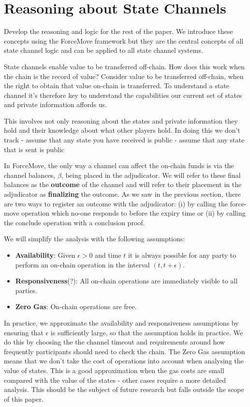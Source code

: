 \documentclass{article}
\theoremstyle{definition}
\begin{document}
\section{Reasoning about State Channels}

Develop the reasoning and logic for the rest of the paper.
We introduce these concepts using the ForceMove framework but they are the central concepts of all state channel logic and can be applied to all state channel systems.

State channels enable value to be transferred off-chain.
How does this work when the chain is the record of value?
Consider value to be transferred off-chain, when the right to obtain
that value on-chain is transferred.
To understand a state channel it's therefore key to understand the capabilities our current set of states and private information affords us.

This involves not only reasoning about the states and private information they hold and their knowledge about what other players hold. In doing this
we don't track 
- assume that any state you have received is public
- assume that any state that is sent is public

In ForceMove, the only way a channel can affect the on-chain funds is via
the channel balances, $\beta$, being placed in the adjudicator. We will
refer to these final balances as the \textbf{outcome} of the channel and
will refer to their placement in the adjudicator as \textbf{finalizing} the outcome. As we saw in the previous section, there are two ways to register an outcome with the adjudicator: (i) by calling the force-move operation which no-one responds to before the expiry time or (ii) by calling the conclude operation with a conclusion proof.

We will simplify the analysis with the following assumptions:
\begin{itemize}
\item \textbf{Availability}: Given $\epsilon > 0$ and time $t$ it is always possible for any party to perform an on-chain operation in the interval $(t, t+\epsilon)$.
\item \textbf{Responsiveness}(?): All on-chain operations are immediately visible to all parties.
\item \textbf{Zero Gas}: On-chain operations are free.
\end{itemize}
In practice, we approximate the availability and responsiveness assumptions by ensuring that $\epsilon$ is sufficiently large, so that the assumption holds in practice. We do this by choosing the the channel timeout and requirements around how frequently participants should need to check the chain. The Zero Gas assumption means that we don't take the cost of operations into account when analysing the value of states. This is a good approximation when the gas costs are small compared with the value of the states - other cases require a more detailed analysis. This should be the subject of future research but falls outside the scope of this paper.
\end{document}
